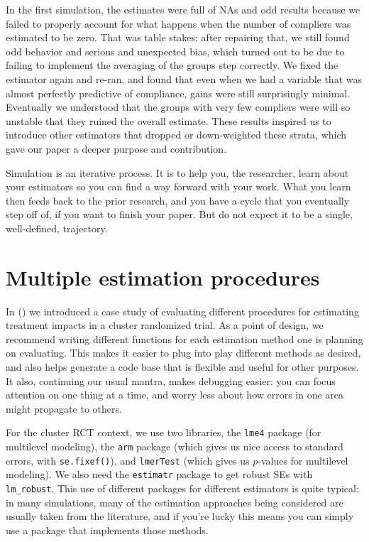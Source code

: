 \documentclass[
]{book}
\begin{document}
In the first simulation, the estimates were full of NAs and odd results because we failed to properly account for what happens when the number of compliers was estimated to be zero.
That was table stakes: after repairing that, we still found odd behavior and serious and unexpected bias, which turned out to be due to failing to implement the averaging of the groups step correctly.
We fixed the estimator again and re-ran, and found that even when we had a variable that was almost perfectly predictive of compliance, gains were still surprisingly minimal.
Eventually we understood that the groups with very few compliers were will so unstable that they ruined the overall estimate.
These results inspired us to introduce other estimators that dropped or down-weighted these strata, which gave our paper a deeper purpose and contribution.

Simulation is an iterative process.
It is to help you, the researcher, learn about your estimators so you can find a way forward with your work.
What you learn then feeds back to the prior research, and you have a cycle that you eventually step off of, if you want to finish your paper.
But do not expect it to be a single, well-defined, trajectory.

\hypertarget{multiple-estimation-procedures}{%
\section{Multiple estimation procedures}\label{multiple-estimation-procedures}}

In \citet{chap_DGP} (\citet{case_cluster}) we introduced a case study of evaluating different procedures for estimating treatment impacts in a cluster randomized trial.
As a point of design, we recommend writing different functions for each estimation method one is planning on evaluating. This makes it easier to plug into play different methods as desired, and also helps generate a code base that is flexible and useful for other purposes.
It also, continuing our usual mantra, makes debugging easier: you can focus attention on one thing at a time, and worry less about how errors in one area might propagate to others.

For the cluster RCT context, we use two libraries, the \texttt{lme4} package (for multilevel modeling), the \texttt{arm} package (which gives us nice access to standard errors, with \texttt{se.fixef()}), and \texttt{lmerTest} (which gives us \(p\)-values for multilevel modeling).
We also need the \texttt{estimatr} package to get robust SEs with \texttt{lm\_robust}.
This use of different packages for different estimators is quite typical: in many simulations, many of the estimation approaches being considered are usually taken from the literature, and if you're lucky this means you can simply use a package that implements those methods.
\end{document}
